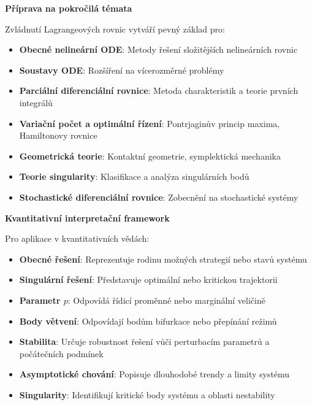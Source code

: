 \vspace{1\baselineskip}

\noindent\textbf{Příprava na pokročilá témata}

Zvládnutí Lagrangeových rovnic vytváří pevný základ pro:
\begin{itemize}
\item \textbf{Obecné nelineární ODE}: Metody řešení složitějších nelineárních rovnic
\item \textbf{Soustavy ODE}: Rozšíření na vícerozměrné problémy
\item \textbf{Parciální diferenciální rovnice}: Metoda charakteristik a teorie prvních integrálů
\item \textbf{Variační počet a optimální řízení}: Pontrjaginův princip maxima, Hamiltonovy rovnice
\item \textbf{Geometrická teorie}: Kontaktní geometrie, symplektická mechanika
\item \textbf{Teorie singularity}: Klasifikace a analýza singulárních bodů
\item \textbf{Stochastické diferenciální rovnice}: Zobecnění na stochastické systémy
\end{itemize}

\vspace{1\baselineskip}

\noindent\textbf{Kvantitativní interpretační framework}

Pro aplikace v kvantitativních vědách:
\begin{itemize}
\item \textbf{Obecné řešení}: Reprezentuje rodinu možných strategií nebo stavů systému
\item \textbf{Singulární řešení}: Představuje optimální nebo kritickou trajektorii
\item \textbf{Parametr $p$}: Odpovídá řídicí proměnné nebo marginální veličině
\item \textbf{Body větvení}: Odpovídají bodům bifurkace nebo přepínání režimů
\item \textbf{Stabilita}: Určuje robustnost řešení vůči perturbacím parametrů a počátečních podmínek
\item \textbf{Asymptotické chování}: Popisuje dlouhodobé trendy a limity systému
\item \textbf{Singularity}: Identifikují kritické body systému a oblasti nestability
\end{itemize}

\vspace{1\baselineskip}

